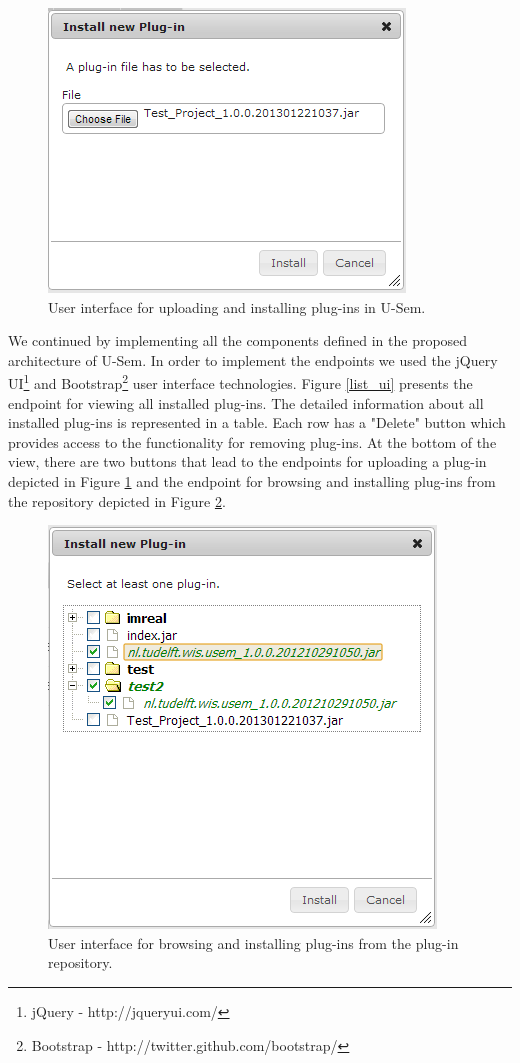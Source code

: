 \begin{figure}[h!]
  \centering
  	\includegraphics[scale=0.6]{plug-in/ui/upload.png}
  \caption{User interface for uploading and installing plug-ins in U-Sem.}
  \label{upload_ui}
\end{figure}

We continued by implementing all the components defined in the proposed architecture of U-Sem. In order to implement the endpoints we used the jQuery UI\footnote{jQuery - http://jqueryui.com/} and Bootstrap\footnote{Bootstrap - http://twitter.github.com/bootstrap/} user interface technologies. Figure \ref{list_ui} presents the endpoint for viewing all installed plug-ins. The detailed information about all installed plug-ins is represented in a table. Each row has a "Delete" button which provides access to the functionality for removing plug-ins. At the bottom of the view, there are two buttons that lead to the endpoints for uploading a plug-in depicted in Figure \ref{upload_ui} and the endpoint for browsing and installing plug-ins from the repository depicted in Figure \ref{repo_ui}.

\begin{figure}[h!]
  \centering
  	\includegraphics[scale=0.6]{plug-in/ui/repo.png}
  \caption{User interface for browsing and installing plug-ins from the plug-in repository.}
  \label{repo_ui}
\end{figure}

